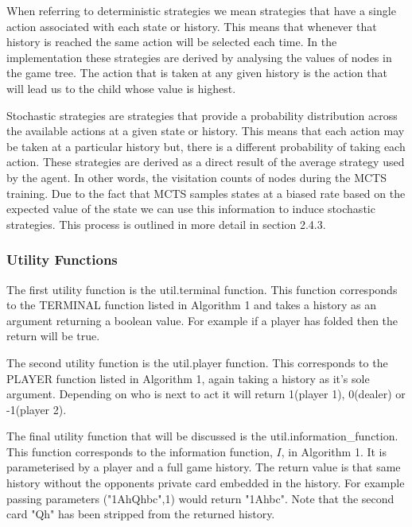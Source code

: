 When referring to deterministic strategies we mean strategies that have a single
action associated with each state or history.
This means that whenever that history is reached the same action will be selected each time.
In the implementation these strategies are derived by analysing the values of nodes in the game tree.
The action that is taken at any given history is the action that will lead us to the child whose
value is highest.

Stochastic strategies are strategies that provide a probability distribution across the available actions
at a given state or history.
This means that each action may be taken at a particular history but, there is a different probability
of taking each action.
These strategies are derived as a direct result of the average strategy used by the agent.
In other words, the visitation counts of nodes during the MCTS training.
Due to the fact that MCTS samples states at a biased rate based on the expected value of the state we
can use this information to induce stochastic strategies.
This process is outlined in more detail in section 2.4.3.

\subsubsection{Utility Functions}\label{subsec:utility}
The first utility function is the util.terminal function.
This function corresponds to the TERMINAL function listed in Algorithm 1 and
takes a history as an argument returning a boolean value.
For example if a player has folded then the return will be true.

The second utility function is the util.player function.
This corresponds to the PLAYER function listed in Algorithm 1, again taking a history as it's sole argument.
Depending on who is next to act it will return 1(player 1), 0(dealer) or -1(player 2).

The final utility function that will be discussed is the util.information\_function.
This function corresponds to the information function, $I$, in Algorithm 1.
It is parameterised by a player and a full game history.
The return value is that same history without the opponents private card
embedded in the history.
For example passing parameters ("1AhQhbc",1) would return "1Ahbc".
Note that the second card "Qh" has been stripped from the returned history.

